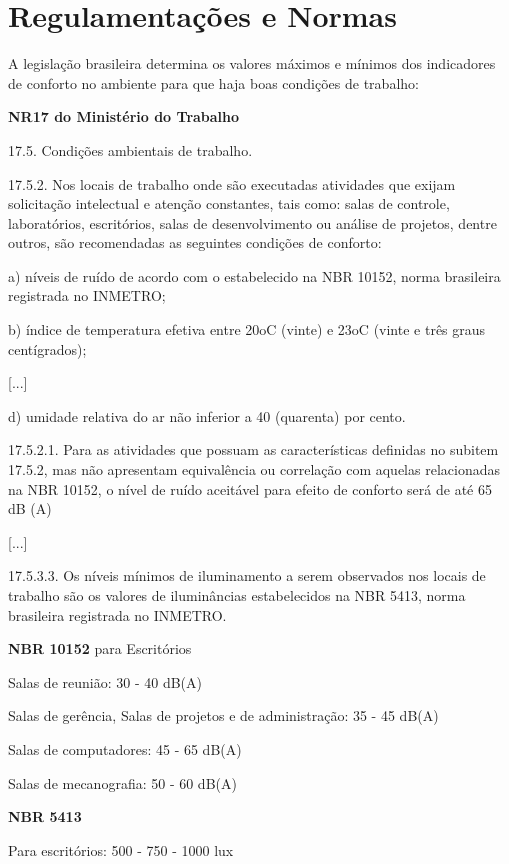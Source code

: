\documentclass[]{politex}
\begin{document}
\section{Regulamentações e Normas} %

A legislação brasileira determina os valores máximos e mínimos dos indicadores de conforto no ambiente para que haja boas condições de trabalho: 

\begin{citacaoLonga} %
\textbf{NR17 do Ministério do Trabalho} \cite{NR17}

17.5. Condições ambientais de trabalho.

17.5.2. Nos locais de trabalho onde são executadas atividades que exijam solicitação intelectual e atenção constantes, tais como: salas de controle, laboratórios, escritórios, salas de desenvolvimento ou análise de projetos, dentre outros, são recomendadas as seguintes condições de conforto:

a) níveis de ruído de acordo com o estabelecido na NBR 10152, norma brasileira registrada no INMETRO;

b) índice de temperatura efetiva entre 20oC (vinte) e 23oC (vinte e três graus centígrados);

[...]

d) umidade relativa do ar não inferior a 40 (quarenta) por cento.

17.5.2.1. Para as atividades que possuam as características definidas no subitem 17.5.2, mas não apresentam equivalência ou correlação com aquelas relacionadas na NBR 10152, o nível de ruído aceitável para efeito de conforto será de até 65 dB (A)

[...]

17.5.3.3. Os níveis mínimos de iluminamento a serem observados nos locais de trabalho são os valores de iluminâncias estabelecidos na NBR 5413, norma brasileira registrada no INMETRO.
\end{citacaoLonga}

\begin{citacaoLonga} %
\textbf{NBR 10152} \cite{NBR10152} para Escritórios

Salas de reunião: 30 - 40 dB(A)

Salas de gerência, Salas de projetos e de administração: 35 - 45 dB(A)

Salas de computadores: 45 - 65 dB(A)

Salas de mecanografia: 50 - 60 dB(A)

\textbf{NBR 5413} \cite{NBR5413}

Para escritórios: 500 - 750 - 1000 lux
\end{citacaoLonga}
\end{document}
